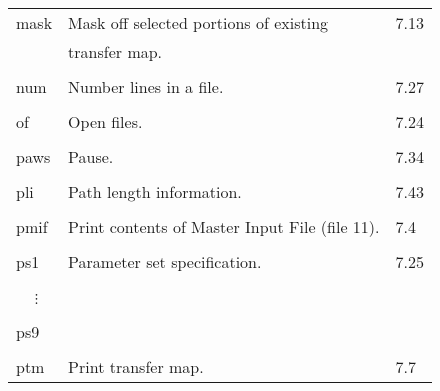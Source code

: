 \begin{center}
\begin{tabular}{lll}
\hspace{1.5em}mask  &      Mask off selected portions of existing & \hspace{2em}7.13\\
                    & transfer map.                                &\\
\vspace{-3mm}& &\\
\hspace{1.5em}num   &        Number lines in a file.               & \hspace{2em}7.27\\
\vspace{-3mm}& &\\
\hspace{1.5em} of   &         Open files.                          & \hspace{2em}7.24\\
\vspace{-3mm}& &\\
\hspace{1.5em}paws  &         Pause.                               & \hspace{2em}7.34\\
\vspace{-3mm}& &\\
\hspace{1.5em}pli  &         Path length
information.                               & \hspace{2em}7.43\\
\vspace{-3mm}& &\\
\hspace{1.5em}pmif  & Print contents of Master Input File (file 11). & \hspace{2em}7.4\\
\vspace{-3mm}& &\\
\hspace{1.5em}ps1   &        Parameter set specification.          & \hspace{2em}7.25\\
\vspace{-7mm}& &\\
\hspace{1.5em}\ \ \,$\vdots$ & &\\
\vspace{-7mm}& &\\
\hspace{1.5em}ps9   & &\\
\vspace{-3mm}& &\\
\hspace{1.5em}ptm   &        Print transfer map.                   & \hspace{2em}7.7
\end{tabular}


\end{center}
